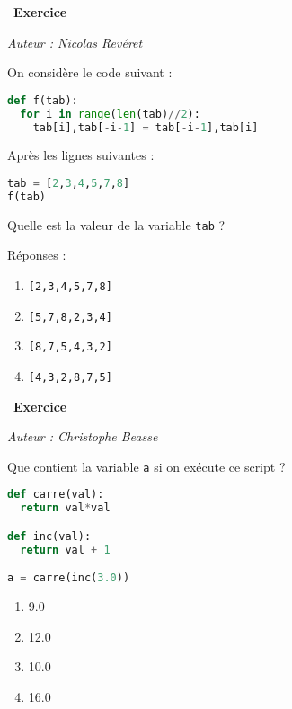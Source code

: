 \documentclass[
  11pt,
]{article}
\newcommand{\passthrough}[1]{#1}
\providecommand{\tightlist}{%
  \setlength{\itemsep}{0pt}\setlength{\parskip}{0pt}}
\newcounter{exo}
\newenvironment{exercice}[1]
{\par \medskip   \addtocounter{exo}{1} \noindent  
\begin{bclogo}[arrondi =0.1,   noborder = true, logo=\bccrayon, marge=4]{~\textbf{Exercice} \textbf{\theexo} {\itshape #1} }  \par}
{
\end{bclogo}
 \par \bigskip }
\newcounter{def}
\begin{document}
\begin{exercice}{}

\emph{Auteur : Nicolas Revéret}

On considère le code suivant :

\begin{lstlisting}[language=Python]
def f(tab):
  for i in range(len(tab)//2):
    tab[i],tab[-i-1] = tab[-i-1],tab[i]
\end{lstlisting}

Après les lignes suivantes :

\begin{lstlisting}[language=Python]
tab = [2,3,4,5,7,8]
f(tab)
\end{lstlisting}

Quelle est la valeur de la variable \passthrough{\lstinline!tab!} ?

Réponses :

\begin{enumerate}
\def\labelenumi{\arabic{enumi}.}
\tightlist
\item
  \passthrough{\lstinline![2,3,4,5,7,8]!}
\item
  \passthrough{\lstinline![5,7,8,2,3,4]!}
\item
  \passthrough{\lstinline![8,7,5,4,3,2]!}
\item
  \passthrough{\lstinline![4,3,2,8,7,5]!}
\end{enumerate}

\end{exercice}

\begin{exercice}{}

\emph{Auteur : Christophe Beasse}

Que contient la variable \passthrough{\lstinline!a!} si on exécute ce
script ?

\begin{lstlisting}[language=Python]
def carre(val):
  return val*val

def inc(val):
  return val + 1

a = carre(inc(3.0))
\end{lstlisting}

\begin{enumerate}
\def\labelenumi{\arabic{enumi}.}
\tightlist
\item
  9.0
\item
  12.0
\item
  10.0
\item
  16.0
\end{enumerate}

\end{exercice}
\end{document}
